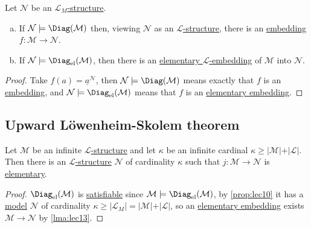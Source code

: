 \begin{lemma}\label{lma:lec13}
	Let \(\mathcal{N} \) be an \hyperref[def:structure]{\(\mathcal{L} _M\)-structure}.
	\begin{enumerate}[(a)]
		\item If \(\mathcal{N} \models \Diag(\mathcal{M} )\) then, viewing \(\mathcal{N} \) as an \hyperref[def:structure]{\(\mathcal{L} \)-structure}, there is an \hyperref[def:embedding]{embedding} \(f\colon \mathcal{M} \to \mathcal{N} \).
		\item If \(\mathcal{N} \models \Diag_{\mathrm{el} }(\mathcal{M} )\), then there is an \hyperref[def:elementary-embedding]{elementary \(\mathcal{L} \)-embedding} of \(\mathcal{M} \) into \(\mathcal{N} \).
	\end{enumerate}
\end{lemma}
\begin{proof}
	Take \(f(a) = \underline{a}^{\mathcal{N} } \), then \(\mathcal{N} \models \Diag(\mathcal{M} )\) means exactly that \(f\) is an \hyperref[def:embedding]{embedding}, and \(\mathcal{N} \models \Diag_{\mathrm{el} }(\mathcal{M} )\) means that \(f\) is an \hyperref[def:elementary-embedding]{elementary embedding}.
\end{proof}

\subsection{Upward Löwenheim-Skolem theorem}

\begin{theorem}\label{thm:upward-Lowenheim-Skolem}
	Let \(\mathcal{M} \) be an infinite \hyperref[def:structure]{\(\mathcal{L} \)-structure} and let \(\kappa \) be an infinite cardinal \(\kappa \geq \vert \mathcal{M}  \vert + \vert \mathcal{L} \vert \). Then there is an \hyperref[def:structure]{\(\mathcal{L} \)-structure} \(\mathcal{N} \) of cardinality \(\kappa \) such that \(j\colon \mathcal{M} \to \mathcal{N} \) is \hyperref[def:elementary-embedding]{elementary}.
\end{theorem}
\begin{proof}
	\(\Diag_{\mathrm{el} }(\mathcal{M} )\) is \hyperref[def:satisfiable]{satisfiable} since \(\mathcal{M} \models \Diag_{\mathrm{el} }(\mathcal{M} )\), by \autoref{prop:lec10} it has a \hyperref[def:model]{model} \(\mathcal{N} \) of cardinality \(\kappa \geq \vert \mathcal{L} _M \vert = \vert \mathcal{M} \vert + \vert \mathcal{L} \vert \), so an \hyperref[def:elementary-embedding]{elementary embedding} exists \(\mathcal{M} \to \mathcal{N} \) by \autoref{lma:lec13}.
\end{proof}

